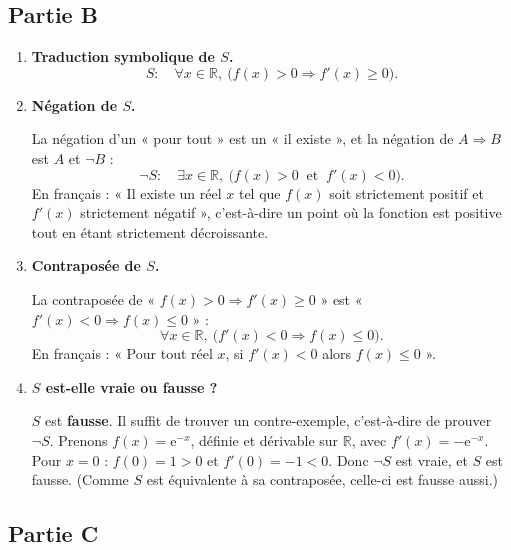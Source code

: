 \documentclass[11pt,a4paper]{article}
\newcommand{\e}{\mathrm{e}}
\newcommand{\R}{\mathbb{R}}
\begin{document}
\subsection*{Partie B}

\begin{enumerate}

\item \textbf{Traduction symbolique de $S$.}
\[
S : \quad \forall x\in\R,\ \bigl(f(x)>0 \Rightarrow f'(x)\geqslant 0\bigr).
\]

\item \textbf{Négation de $S$.}

La négation d'un « pour tout » est un « il existe », et la négation de $A\Rightarrow B$ est
$A$ et $\neg B$ :
\[
\neg S : \quad \exists x\in\R,\ \bigl(f(x)>0 \ \text{ et }\ f'(x)<0\bigr).
\]
En français : « Il existe un réel $x$ tel que $f(x)$ soit strictement positif et $f'(x)$ strictement négatif »,
c'est-à-dire un point où la fonction est positive tout en étant strictement décroissante.

\item \textbf{Contraposée de $S$.}

La contraposée de « $f(x)>0\Rightarrow f'(x)\geqslant0$ » est « $f'(x)<0\Rightarrow f(x)\leqslant0$ » :
\[
\forall x\in\R,\ \bigl(f'(x)<0 \Rightarrow f(x)\leqslant 0\bigr).
\]
En français : « Pour tout réel $x$, si $f'(x)<0$ alors $f(x)\leqslant 0$ ».

\item \textbf{$S$ est-elle vraie ou fausse ?}

$S$ est \textbf{fausse}. Il suffit de trouver un contre-exemple, c'est-à-dire de prouver $\neg S$.
Prenons $f(x)=\e^{-x}$, définie et dérivable sur $\R$, avec $f'(x)=-\e^{-x}$.
Pour $x=0$ : $f(0)=1>0$ et $f'(0)=-1<0$.
Donc $\neg S$ est vraie, et $S$ est fausse.
(Comme $S$ est équivalente à sa contraposée, celle-ci est fausse aussi.)
\end{enumerate}

\subsection*{Partie C}
\end{document}
